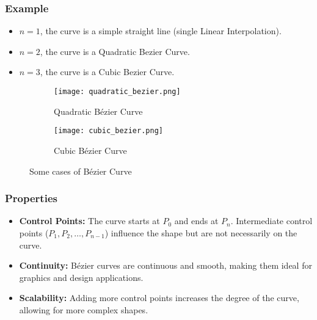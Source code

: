 \subsubsection*{Example}
\begin{itemize}
  \item $n = 1$, the curve is a simple straight line (single Linear Interpolation).
  \item $n = 2$, the curve is a Quadratic Bezier Curve.
  \item $n = 3$, the curve is a Cubic Bezier Curve.
\end{itemize}
\begin{figure}[ht]
  \centering
  \begin{subfigure}[b]{0.45\textwidth}
    \centering
    \texttt{[image: quadratic\_bezier.png]}
    \caption{Quadratic Bézier Curve}
  \end{subfigure}
  \hfill
  \begin{subfigure}[b]{0.45\textwidth}
    \centering
    \texttt{[image: cubic\_bezier.png]}
    \caption{Cubic Bézier Curve}
  \end{subfigure}
  \caption{Some cases of Bézier Curve}
\end{figure}

\subsubsection{Properties}
\begin{itemize}
  \item \textbf{Control Points:} The curve starts at $P_0$ and ends at $P_n$. Intermediate control points ($P_1, P_2, \ldots, P_{n-1}$) influence the shape but are not necessarily on the curve.
  \item \textbf{Continuity:} Bézier curves are continuous and smooth, making them ideal for graphics and design applications.
  \item \textbf{Scalability:} Adding more control points increases the degree of the curve, allowing for more complex shapes.
\end{itemize}

